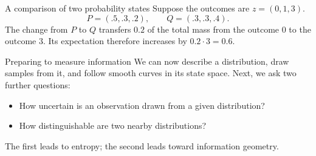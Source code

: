 \documentclass[aspectratio=169,11pt]{beamer}
\begin{document}
\begin{frame}{A comparison of two probability states}
Suppose the outcomes are \(z=(0,1,3)\).
\vspace{.35cm}
\[
P=(.5,.3,.2),\qquad Q=(.3,.3,.4).
\]
\vspace{.4cm}
The change from \(P\) to \(Q\) transfers \(0.2\) of the total mass
from the outcome \(0\) to the outcome \(3\).
\vspace{.34cm}
Its expectation therefore increases by \(0.2\cdot3=0.6\).
\end{frame}

\begin{frame}{Preparing to measure information}
We can now describe a distribution, draw samples from it, and follow
smooth curves in its state space.
\vspace{.53cm}
Next, we ask two further questions:
\vspace{.25cm}
\begin{itemize}\setlength{\itemsep}{.42cm}
\item How uncertain is an observation drawn from a given distribution?
\item How distinguishable are two nearby distributions?
\end{itemize}
\vspace{.32cm}
The first leads to entropy; the second leads toward information geometry.
\end{frame}
\end{document}
